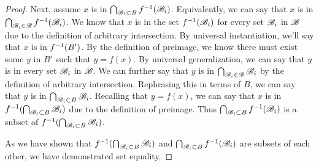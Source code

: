 \documentclass[main.tex]{subfiles}
\begin{document}
\begin{proof}
	Next, assume \(x\) is in
	\(\bigcap_{\mathscr{B}_i \subset B} {{f}^{-1}(\mathscr{B}_i)}\).
	Equivalently, we can say that \(x\) is in
	\(\bigcap_{\mathscr{B}_i \in \mathscr{B}} {{f}^{-1}(\mathscr{B}_i)}\).
	We know that \(x\) is in the set \({f}^{-1}(\mathscr{B}_i)\) for
	every set \(\mathscr{B}_i\) in \(\mathscr{B}\) due to the definition of
	arbitrary intersection. By universal instantiation, we'll say that \(x\)
	is in \({f}^{-1}(B')\). By the definition of preimage, we know there
	must exist some \(y\) in \(B'\) such that \(y = f(x)\). By universal
	generalization, we can say that \(y\) is in every set \(\mathscr{B}_i\)
	in \(\mathscr{B}\). We can further say that \(y\) is in
	\(\bigcap_{\mathscr{B}_i \in \mathscr{B}} {\mathscr{B}_i}\)
	by the definition of arbitrary intersection. Rephrasing this in terms of
	\(B\), we can say that \(y\) is in
	\(\bigcap_{\mathscr{B}_i \subset B} {\mathscr{B}_i}\).
	Recalling that \(y = f(x)\), we can say that \(x\) is in
	\({f}^{-1}(\bigcap_{\mathscr{B}_i \subset B} {\mathscr{B}_i})\)
	due to the definition of preimage. Thus
	\(\bigcap_{\mathscr{B}_i \subset B} {{f}^{-1}(\mathscr{B}_i)}\)
	is a subset of
	\({f}^{-1}(\bigcap_{\mathscr{B}_i \subset B} {\mathscr{B}_i})\).

	As we have shown that
	\({f}^{-1}(\bigcap_{\mathscr{B}_i \subset B} {\mathscr{B}_i})\)
	and
	\(\bigcap_{\mathscr{B}_i \subset B} {{f}^{-1}(\mathscr{B}_i)}\)
	are subsets of each other, we have demonstrated set equality.
\end{proof}
\end{document}
